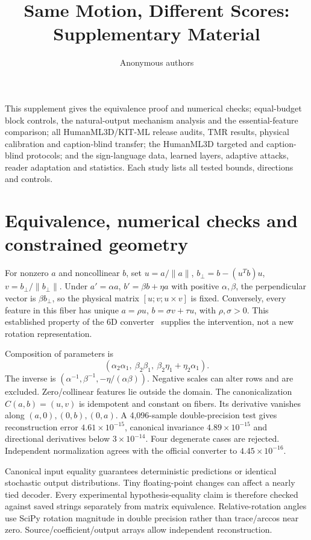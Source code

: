 \documentclass[10pt,twocolumn,letterpaper]{article}
\title{Same Motion, Different Scores:\\ Supplementary Material}
\author{Anonymous authors}
\begin{document}
\raggedbottom\maketitle
\setcounter{section}{0}

This supplement gives the equivalence proof and numerical checks; equal-budget block controls, the natural-output mechanism analysis and the essential-feature comparison; all HumanML3D/KIT-ML release audits, TMR results, physical calibration and caption-blind transfer; the HumanML3D targeted and caption-blind protocols; and the sign-language data, learned layers, adaptive attacks, reader adaptation and statistics. Each study lists all tested bounds, directions and controls.

\section{Equivalence, numerical checks and constrained geometry}
For nonzero $a$ and noncollinear $b$, set $u=a/\|a\|$, $b_\perp=b-(u^Tb)u$, $v=b_\perp/\|b_\perp\|$. Under $a'=\alpha a$, $b'=\beta b+\eta a$ with positive $\alpha,\beta$, the perpendicular vector is $\beta b_\perp$, so the physical matrix $[u;v;u\times v]$ is fixed. Conversely, every feature in this fiber has unique $a=\rho u$, $b=\sigma v+\tau u$, with $\rho,\sigma>0$. This established property of the 6D converter~\cite{zhou2019} supplies the intervention, not a new rotation representation.

Composition of parameters is
\begin{equation}
(\alpha_2\alpha_1,\ \beta_2\beta_1,\ \beta_2\eta_1+\eta_2\alpha_1).
\end{equation}
The inverse is $(\alpha^{-1},\beta^{-1},-\eta/(\alpha\beta))$. Negative scales can alter rows and are excluded. Zero/collinear features lie outside the domain. The canonicalization $C (a,b)=(u,v)$ is idempotent and constant on fibers. Its derivative vanishes along $(a,0),(0,b),(0,a)$. A 4,096-sample double-precision test gives reconstruction error $4.61\times 10^{-15}$, canonical invariance $4.89\times 10^{-15}$ and directional derivatives below $3\times 10^{-14}$. Four degenerate cases are rejected. Independent normalization agrees with the official converter to $4.45\times 10^{-16}$.

Canonical input equality guarantees deterministic predictions or identical stochastic output distributions. Tiny floating-point changes can affect a nearly tied decoder. Every experimental hypothesis-equality claim is therefore checked against saved strings separately from matrix equivalence. Relative-rotation angles use SciPy rotation magnitude in double precision rather than trace/arccos near zero. Source/coefficient/output arrays allow independent reconstruction.
\end{document}
